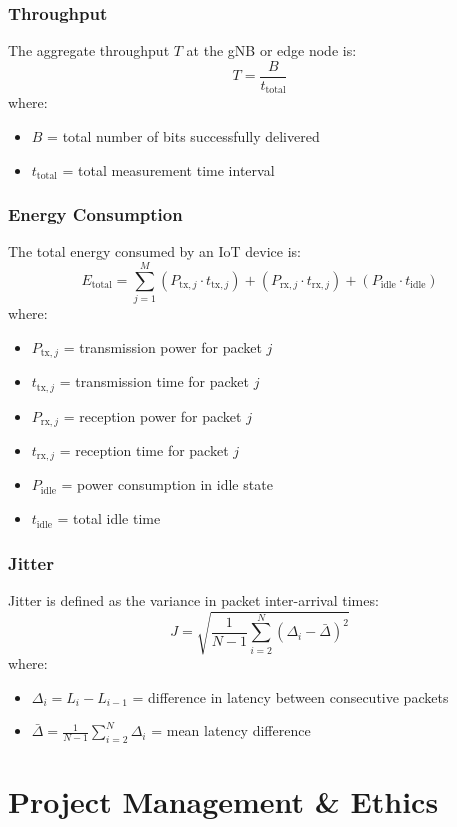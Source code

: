 \documentclass[12pt,a4paper]{article}
\begin{document}
\subsubsection{Throughput}
The aggregate throughput \(T\) at the gNB or edge node is:
\[
T = \frac{B}{t_{\text{total}}}
\]
where:
\begin{itemize}
    \item \(B\) = total number of bits successfully delivered
    \item \(t_{\text{total}}\) = total measurement time interval
\end{itemize}

\subsubsection{Energy Consumption}
The total energy consumed by an IoT device is:
\[
E_{\text{total}} = \sum_{j=1}^{M} (P_{\text{tx},j} \cdot t_{\text{tx},j}) + (P_{\text{rx},j} \cdot t_{\text{rx},j}) + (P_{\text{idle}} \cdot t_{\text{idle}})
\]
where:
\begin{itemize}
    \item \(P_{\text{tx},j}\) = transmission power for packet \(j\)
    \item \(t_{\text{tx},j}\) = transmission time for packet \(j\)
    \item \(P_{\text{rx},j}\) = reception power for packet \(j\)
    \item \(t_{\text{rx},j}\) = reception time for packet \(j\)
    \item \(P_{\text{idle}}\) = power consumption in idle state
    \item \(t_{\text{idle}}\) = total idle time
\end{itemize}

\subsubsection{Jitter}
Jitter is defined as the variance in packet inter-arrival times:
\[
J = \sqrt{\frac{1}{N-1}\sum_{i=2}^{N} (\Delta_i - \bar{\Delta})^2}
\]
where:
\begin{itemize}
    \item \(\Delta_i = L_i - L_{i-1}\) = difference in latency between consecutive packets
    \item \(\bar{\Delta} = \frac{1}{N-1}\sum_{i=2}^{N} \Delta_i\) = mean latency difference
\end{itemize}

\section{Project Management \& Ethics}
\end{document}
